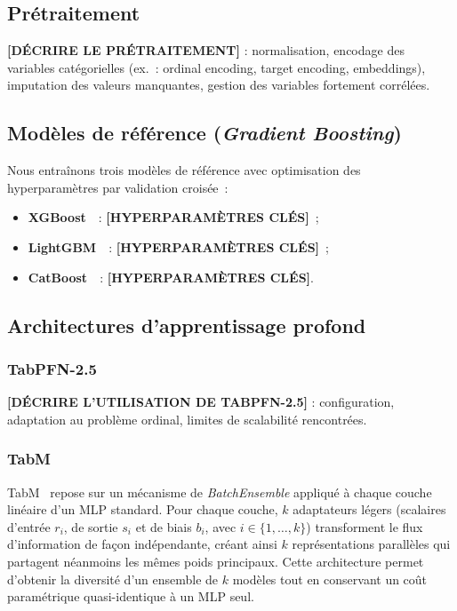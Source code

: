 \documentclass[conference]{IEEEtran}
\begin{document}
\subsection{Prétraitement}

\textbf{[DÉCRIRE LE PRÉTRAITEMENT]} : normalisation, encodage des variables catégorielles
(ex.~: ordinal encoding, target encoding, embeddings), imputation des valeurs manquantes,
gestion des variables fortement corrélées.

\subsection{Modèles de référence (\textit{Gradient Boosting})}

Nous entraînons trois modèles de référence avec optimisation des hyperparamètres par
validation croisée~:
\begin{itemize}
  \item \textbf{XGBoost}~\cite{chen2016xgboost}~: \textbf{[HYPERPARAMÈTRES CLÉS]}~;
  \item \textbf{LightGBM}~\cite{ke2017lightgbm}~: \textbf{[HYPERPARAMÈTRES CLÉS]}~;
  \item \textbf{CatBoost}~\cite{prokhorenkova2018catboost}~: \textbf{[HYPERPARAMÈTRES CLÉS]}.
\end{itemize}

\subsection{Architectures d'apprentissage profond}

\subsubsection{TabPFN-2.5}
\textbf{[DÉCRIRE L'UTILISATION DE TABPFN-2.5]} : configuration, adaptation au problème
ordinal, limites de scalabilité rencontrées.

\subsubsection{TabM}
TabM~\cite{gorishniy2024tabm} repose sur un mécanisme de \textit{BatchEnsemble} appliqué
à chaque couche linéaire d'un MLP standard. Pour chaque couche, $k$ adaptateurs légers
(scalaires d'entrée $r_i$, de sortie $s_i$ et de biais $b_i$, avec $i \in \{1,\ldots,k\}$)
transforment le flux d'information de façon indépendante, créant ainsi $k$ représentations
parallèles qui partagent néanmoins les mêmes poids principaux. Cette architecture permet
d'obtenir la diversité d'un ensemble de $k$ modèles tout en conservant un coût
paramétrique quasi-identique à un MLP seul.
\end{document}
